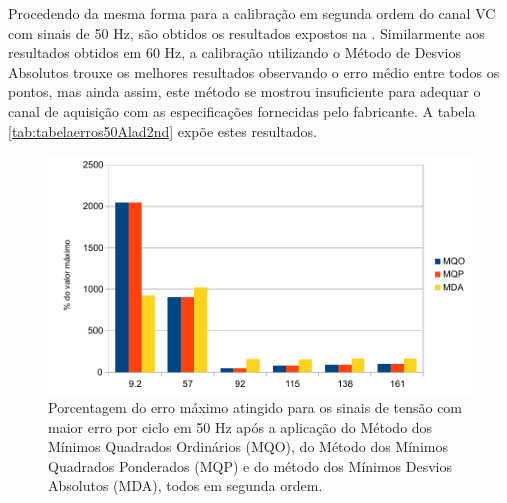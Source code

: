 \begin{table}[htb]
\end{table}
  
    Procedendo da mesma forma para a calibração em segunda ordem do canal VC com sinais de 50 Hz, são obtidos os resultados expostos na . Similarmente aos resultados obtidos em 60 Hz, a calibração utilizando o Método de Desvios Absolutos trouxe os melhores resultados observando o erro médio entre todos os pontos, mas ainda assim, este método se mostrou insuficiente para adequar o canal de aquisição com as especificações fornecidas pelo fabricante. A tabela \ref{tab:tabelaerros50Alad2nd} expõe estes resultados.

  \begin{figure}
    \caption{Porcentagem do erro máximo atingido para os sinais de tensão com maior erro por ciclo em 50 Hz após a aplicação do Método dos Mínimos Quadrados Ordinários (MQO), do Método dos Mínimos Quadrados Ponderados (MQP) e do método dos Mínimos Desvios Absolutos (MDA), todos em segunda ordem.}
    \label{fig:res_volt2nd50}
    \centering
    \includegraphics[width=0.9\linewidth]{pictures/max_err_VC_aftercalib50_2nd.pdf}
\end{figure}


